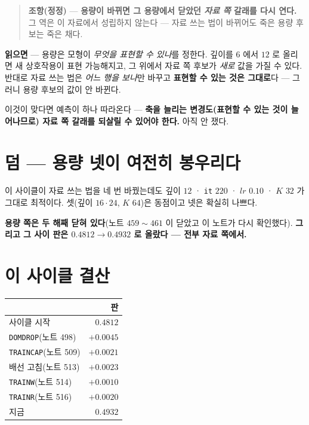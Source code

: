 \documentclass[11pt]{article}
\begin{document}
\begin{quote}
\textbf{조항(정정)} --- \textbf{용량이 바뀌면 그 용량에서 닫았던 \emph{자료
쪽} 갈래를 다시 연다.} 그 역은 이 자료에서 성립하지 않는다 --- 자료 쓰는
법이 바뀌어도 죽은 용량 후보는 죽은 채다.
\end{quote}

\textbf{읽으면} --- 용량은 모형이 \emph{무엇을 표현할 수 있나}를 정한다.
깊이를 $6$ 에서 $12$ 로 올리면 새 상호작용이 표현 가능해지고, 그 위에서
자료 쪽 후보가 \emph{새로} 값을 가질 수 있다. 반대로 자료 쓰는 법은
\emph{어느 행을 보나}만 바꾸고 \textbf{표현할 수 있는 것은 그대로}다 ---
그러니 용량 후보의 값이 안 바뀐다.

이것이 맞다면 예측이 하나 따라온다 --- \textbf{축을 늘리는 변경도(표현할
수 있는 것이 늘어나므로) 자료 쪽 갈래를 되살릴 수 있어야 한다.} 아직 안
쟀다.

\section{덤 --- 용량 넷이 여전히 봉우리다}

이 사이클이 자료 쓰는 법을 네 번 바꿨는데도 깊이 $12$ · \texttt{it} $220$
· $lr$ $0.10$ · $K$ $32$ 가 그대로 최적이다. 셋(깊이 $16 \cdot 24$, $K$
$64$)은 동점이고 넷은 확실히 나쁘다.

\textbf{용량 쪽은 두 해째 닫혀 있다}(노트 $459 \sim 461$ 이 닫았고 이
노트가 다시 확인했다). \textbf{그리고 그 사이 판은 $0.4812 \to 0.4932$ 로
올랐다 --- 전부 자료 쪽에서.}

\section*{이 사이클 결산}

\begin{center}
\begin{tabular}{lr}
\hline
& 판 \\
\hline
사이클 시작 & $0.4812$ \\
\texttt{DOMDROP}(노트 498) & $+0.0045$ \\
\texttt{TRAINCAP}(노트 509) & $+0.0021$ \\
배선 고침(노트 513) & $+0.0023$ \\
\texttt{TRAINW}(노트 514) & $+0.0010$ \\
\texttt{TRAINR}(노트 516) & $+0.0020$ \\
\hline
지금 & $\mathbf{0.4932}$ \\
\hline
\end{tabular}
\end{center}
\end{document}
